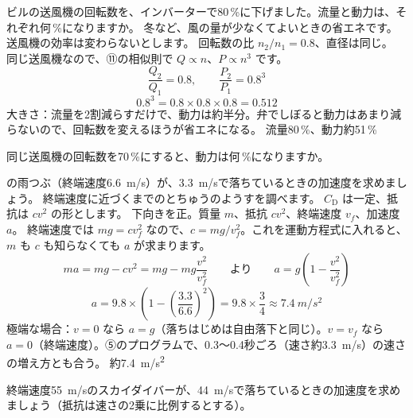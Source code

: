 \begin{phreidai}[送風機の回転数を下げると]\label{ph:力-15:ex11}
ビルの送風機の回転数を、インバーターで80\,\%に下げました。流量と動力は、それぞれ何\,\%になりますか。
\phbamen
冬など、風の量が少なくてよいときの省エネです。
\phmushi
送風機の効率は変わらないとします。
\phzu
回転数の比 $n_2/n_1=0.8$、直径は同じ。
\phriyu
同じ送風機なので、⑪の相似則で $Q\propto n$、$P\propto n^3$ です。
\phtateru
\[\frac{Q_2}{Q_1}=0.8,\qquad\frac{P_2}{P_1}=0.8^3\]
\phtoku
\[0.8^3=0.8\times0.8\times0.8=0.512\]
\phtashikame
大きさ：流量を2割減らすだけで、動力は約半分。弁でしぼると動力はあまり減らないので、回転数を変えるほうが省エネになる。
\kotae 流量80\,\%、動力約51\,\%
\end{phreidai}
\begin{jibun}
同じ送風機の回転数を70\,\%にすると、動力は何\,\%になりますか。
\end{jibun}

\begin{phreidai}\label{ph:力-15:ex12}
の雨つぶ（終端速度\qty{6.6}{m/s}）が、\qty{3.3}{m/s}で落ちているときの加速度を求めましょう。
\phbamen
終端速度に近づくまでのとちゅうのようすを調べます。
\phmushi
$C_{\mathrm D}$ は一定、抵抗は $cv^2$ の形とします。
\phzu
下向きを正。質量 $m$、抵抗 $cv^2$、終端速度 $v_f$、加速度 $a$。
\phriyu
終端速度では $mg=cv_f^2$ なので、$c=mg/v_f^2$。これを運動方程式に入れると、$m$ も $c$ も知らなくても $a$ が求まります。
\phtateru
\[ma=mg-cv^2=mg-mg\frac{v^2}{v_f^2}\qquad\text{より}\qquad a=g\left(1-\frac{v^2}{v_f^2}\right)\]
\phtoku
\[a=9.8\times\left(1-\left(\frac{3.3}{6.6}\right)^2\right)=9.8\times\frac34\approx\qty{7.4}{m/s^2}\]
\phtashikame
極端な場合：$v=0$ なら $a=g$（落ちはじめは自由落下と同じ）。$v=v_f$ なら $a=0$（終端速度）。⑤のプログラムで、0.3〜0.4秒ごろ（速さ約\qty{3.3}{m/s}）の速さの増え方とも合う。
\kotae 約\qty{7.4}{m/s^2}
\end{phreidai}
\begin{jibun}
終端速度\qty{55}{m/s}のスカイダイバーが、\qty{44}{m/s}で落ちているときの加速度を求めましょう（抵抗は速さの2乗に比例するとする）。
\end{jibun}

